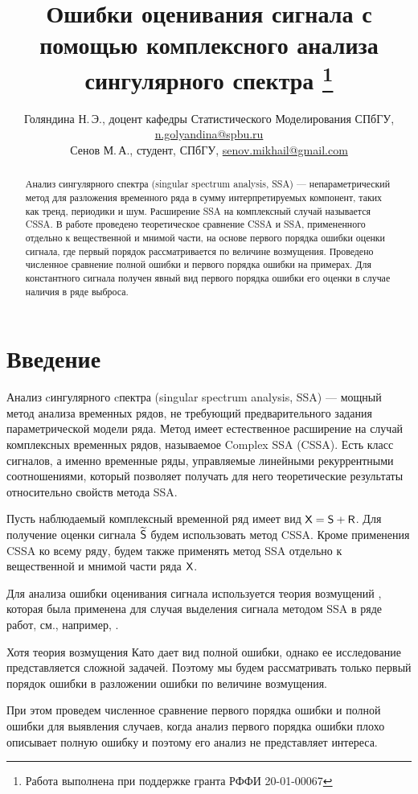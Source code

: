 \documentclass{spisok-article}
\title{Ошибки оценивания сигнала с помощью комплексного анализа сингулярного спектра
    \thanks{Работа выполнена при поддержке гранта РФФИ 20-01-00067}
}
\author{Голяндина Н.\,Э., доцент кафедры Статистического Моделирования СПбГУ,
    \href{mailto:n.golyandina@spbu.ru}{n.golyandina@spbu.ru }\\
    Сенов М.\,А., студент, СПбГУ,
    \href{mailto:senov.mikhail@gmail.com}{senov.mikhail@gmail.com}%
}
\begin{document}
\maketitle

\begin{abstract}
Анализ сингулярного спектра (singular spectrum analysis, SSA)
--- непараметрический метод для разложения временного ряда в сумму
интерпретируемых компонент, таких как тренд, периодики и шум. Расширение SSA на комплексный случай называется CSSA.
В работе проведено теоретическое сравнение CSSA и SSA, примененного отдельно к вещественной и мнимой части, на основе первого порядка ошибки оценки сигнала, где первый порядок рассматривается по величине возмущения. Проведено численное сравнение полной ошибки и первого порядка ошибки на примерах. Для константного сигнала получен явный вид первого порядка ошибки его оценки в случае наличия в ряде выброса.
\end{abstract}

\section{Введение}
Анализ cингулярного cпектра (singular spectrum analysis, SSA)  \cite{Golyandina.etal2001}
 --- мощный метод анализа временных
рядов, не требующий предварительного задания параметрической модели ряда. Метод имеет естественное расширение на случай комплексных временных рядов, называемое Complex SSA (CSSA).
Есть класс сигналов, а именно временные ряды, управляемые линейными рекуррентными соотношениями, который позволяет получать для него теоретические результаты относительно свойств метода SSA.

Пусть наблюдаемый комплексный временной ряд имеет вид $\textsf{X} =\textsf{S} + \textsf{R}$. Для получение оценки сигнала $\widetilde{\textsf{S}}$ будем использовать метод CSSA. Кроме применения CSSA ко всему ряду, будем также применять метод SSA отдельно к вещественной и мнимой части ряда $\textsf{X}$.

Для анализа ошибки оценивания сигнала используется теория возмущений \cite{Kato}, которая была применена для случая выделения сигнала методом SSA в ряде работ, см., например, \cite{Nekrutkin}.

Хотя теория возмущения Като дает вид полной ошибки, однако ее исследование представляется сложной задачей. Поэтому мы будем рассматривать только первый порядок ошибки в разложении ошибки по величине возмущения.

При этом проведем численное сравнение первого порядка ошибки и полной ошибки для выявления случаев, когда анализ первого порядка ошибки плохо описывает полную ошибку и поэтому его анализ не представляет интереса.
\end{document}
